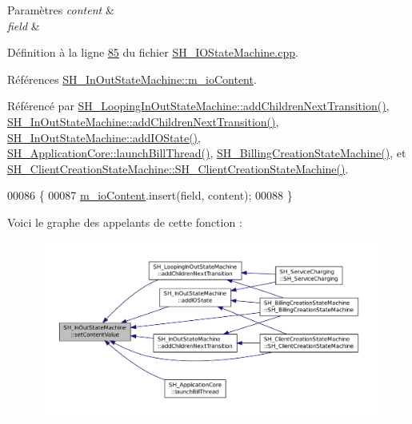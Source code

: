 \begin{DoxyParams}{Paramètres}
{\em content} & \\
\hline
{\em field} & \\
\hline
\end{DoxyParams}


Définition à la ligne \hyperlink{SH__IOStateMachine_8cpp_source_l00085}{85} du fichier \hyperlink{SH__IOStateMachine_8cpp_source}{S\-H\-\_\-\-I\-O\-State\-Machine.\-cpp}.



Références \hyperlink{classSH__InOutStateMachine_a8cfbc27eef057bf37b7711bdfef2077e}{S\-H\-\_\-\-In\-Out\-State\-Machine\-::m\-\_\-io\-Content}.



Référencé par \hyperlink{classSH__LoopingInOutStateMachine_abfae9f47019379f270496de46845c729}{S\-H\-\_\-\-Looping\-In\-Out\-State\-Machine\-::add\-Children\-Next\-Transition()}, \hyperlink{classSH__InOutStateMachine_aa78420f8778d7777809aad77eb8473b4}{S\-H\-\_\-\-In\-Out\-State\-Machine\-::add\-Children\-Next\-Transition()}, \hyperlink{classSH__InOutStateMachine_a2528cffddbe6f98c32ebef41423c0118}{S\-H\-\_\-\-In\-Out\-State\-Machine\-::add\-I\-O\-State()}, \hyperlink{classSH__ApplicationCore_ab72fd6cdc47575d47157fc7bdffae8f2}{S\-H\-\_\-\-Application\-Core\-::launch\-Bill\-Thread()}, \hyperlink{classSH__BillingCreationStateMachine_ad62b77fa4aeafe200056ff3974562f83}{S\-H\-\_\-\-Billing\-Creation\-State\-Machine()}, et \hyperlink{classSH__ClientCreationStateMachine_a0b406b0f404c0fd33bf35be8ce0cc811}{S\-H\-\_\-\-Client\-Creation\-State\-Machine\-::\-S\-H\-\_\-\-Client\-Creation\-State\-Machine()}.


\begin{DoxyCode}
00086 \{
00087     \hyperlink{classSH__InOutStateMachine_a8cfbc27eef057bf37b7711bdfef2077e}{m\_ioContent}.insert(field, content);
00088 \}
\end{DoxyCode}


Voici le graphe des appelants de cette fonction \-:\nopagebreak
\begin{figure}[H]
\begin{center}
\leavevmode
\includegraphics[width=350pt]{classSH__InOutStateMachine_a9ab1534306b2bdb62743d4bcefe40c17_icgraph}
\end{center}
\end{figure}


